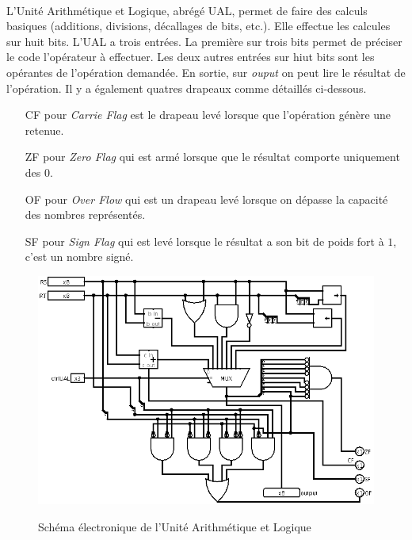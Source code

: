 \paragraph{}{
	L'Unité Arithmétique et Logique, abrégé UAL, permet de faire des calculs
	basiques (additions, divisions, décallages de bits, etc.). Elle effectue
	les calcules sur huit bits. L'UAL a trois entrées. La première sur trois bits
	permet de préciser le code l'opérateur à	effectuer. Les deux autres entrées
	sur hiut bits sont les opérantes de l'opération demandée. \newline
	En sortie, sur \textit{ouput} on peut lire le résultat de l'opération. Il
	y a également quatres drapeaux comme détaillés ci-dessous.
}

\begin{itemize}
	\item[CF] pour \textit{Carrie Flag} est le drapeau levé lorsque que l'opération
	génère une retenue.
	\item[ZF] pour \textit{Zero Flag} qui est armé lorsque que le résultat comporte uniquement
	des $0$.
	\item[OF] pour \textit{Over Flow} qui est un drapeau levé lorsque on dépasse
	la capacité des nombres représentés.
	\item[SF] pour \textit{Sign Flag} qui est levé lorsque le résultat a son
	bit de poids fort à $1$, c'est un nombre signé.
\end{itemize}

\begin{figure}
	\centering
	\includegraphics[scale=0.4,origin=c]{circuits/UAL.png}
	\label{ual_circ}
	\caption{Sch\'{e}ma \'{e}lectronique de l'Unit\'{e} Arithm\'{e}tique et Logique}
\end{figure}

